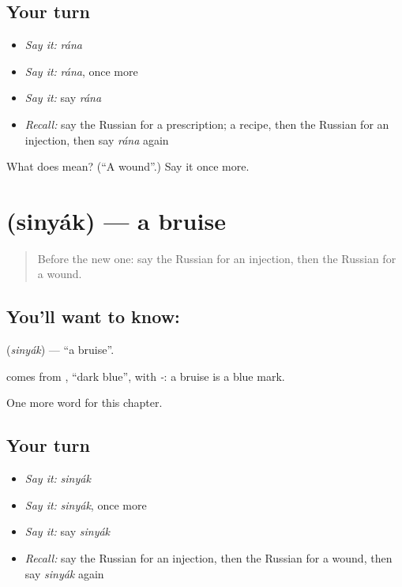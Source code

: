 \subsection*{Your turn}
\begin{itemize}
\raggedright
  \item \emph{Say it:} \emph{rána}
  \item \emph{Say it:} \emph{rána}, once more
  \item \emph{Say it:} say \emph{rána}
  \item \emph{Recall:} say the Russian for a prescription; a recipe, then the Russian for an injection, then say \emph{rána} again
\end{itemize}

\begin{tcolorbox}[breakable,colback=teal!4,colframe=teal!35!black,title={Before you move on}]
What does  mean? (\textquotedblleft{}A wound\textquotedblright{}.) Say it once more.
\end{tcolorbox}
\section[\texorpdfstring{\ru{синяк} (sinyák)}{синяк (sinyák)}]{ (sinyák) — a bruise}

\label{lesson:RU-C179-sinyak}



\begin{quote}
Before the new one: say the Russian for an injection, then the Russian for a wound.
\end{quote}

\subsection*{You'll want to know: }
\textbf{} (\emph{sinyák}) — \textquotedblleft{}a bruise\textquotedblright{}.

\begin{cousinweb}
\textbf{} comes from \emph{}, \textquotedblleft{}dark blue\textquotedblright{}, with \emph{-}: a bruise is a blue mark.
\end{cousinweb}

\begin{grammarlens}[title={What you've built}]
One more word for this chapter.
\end{grammarlens}

\subsection*{Your turn}
\begin{itemize}
\raggedright
  \item \emph{Say it:} \emph{sinyák}
  \item \emph{Say it:} \emph{sinyák}, once more
  \item \emph{Say it:} say \emph{sinyák}
  \item \emph{Recall:} say the Russian for an injection, then the Russian for a wound, then say \emph{sinyák} again
\end{itemize}


